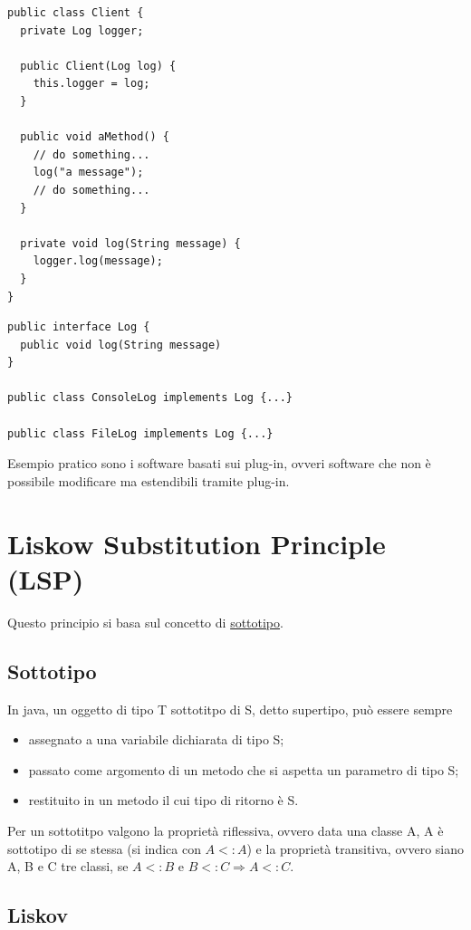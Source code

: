 \begin{multicols}{2}
\begin{lstlisting}
public class Client {
  private Log logger;
    
  public Client(Log log) {
    this.logger = log;
  }
    
  public void aMethod() {
    // do something...
    log("a message");
    // do something...
  }

  private void log(String message) {
    logger.log(message);
  }
}
\end{lstlisting}
\columnbreak
\begin{lstlisting}
public interface Log {
  public void log(String message)
}

public class ConsoleLog implements Log {...}

public class FileLog implements Log {...}
\end{lstlisting}  
\end{multicols}

Esempio pratico sono i software basati sui plug-in, ovveri software che non è possibile modificare ma estendibili tramite plug-in.

\section{Liskow Substitution Principle (LSP)}
 
Questo principio si basa sul concetto di \underline{sottotipo}.

\subsection{Sottotipo}

In java, un oggetto di tipo T sottotitpo di S, detto supertipo, può essere sempre
\begin{itemize}
  \item assegnato a una variabile dichiarata di tipo S;
  \item passato come argomento di un metodo che si aspetta un parametro di tipo S;
  \item restituito in un metodo il cui tipo di ritorno è S.
\end{itemize}

Per un sottotitpo valgono la proprietà riflessiva, ovvero data una classe A, A è sottotipo di se stessa (si indica con $A<:A$) e la proprietà transitiva, ovvero siano 
A, B e C tre classi, se $A<:B$ e $B<:C\Rightarrow A<:C$.

\subsection{Liskov}

